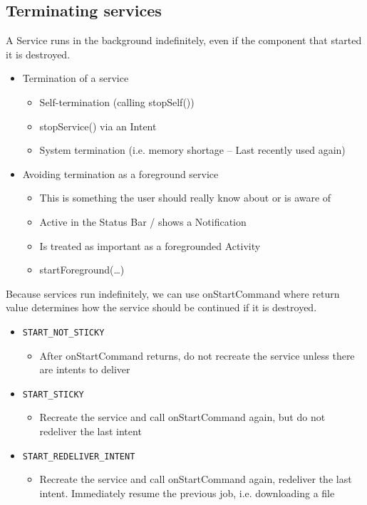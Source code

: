 \documentclass{article}
\begin{document}
\subsection{Terminating services}
\begin{flushleft}
A Service runs in the background indefinitely, even if the component that started it is destroyed.
\begin{itemize}
  \item Termination of a service
  \begin{itemize}
    \item Self-termination (calling stopSelf())
    \item stopService() via an Intent 
    \item System termination (i.e. memory shortage – Last recently used again)
  \end{itemize}
  \item Avoiding termination as a foreground service
  \begin{itemize}
    \item This is something the user should really know about or is aware of
    \item Active in the Status Bar / shows a Notification 
    \item Is treated as important as a foregrounded Activity
    \item startForeground(…)
  \end{itemize}
\end{itemize}
Because services run indefinitely, we can use onStartCommand where return value determines how the service should be continued if it is destroyed.
\begin{itemize}
  \item \verb|START_NOT_STICKY|
  \begin{itemize}
    \item After onStartCommand returns, do not recreate the service unless there are intents to deliver
  \end{itemize}
  \item \verb|START_STICKY|
  \begin{itemize}
    \item Recreate the service and call onStartCommand again, but do not redeliver the last intent
  \end{itemize}
  \item \verb|START_REDELIVER_INTENT|
  \begin{itemize}
    \item Recreate the service and call onStartCommand again, redeliver the last intent. Immediately resume the previous job, i.e. downloading a file
  \end{itemize}
\end{itemize}
\end{flushleft}
\end{document}
